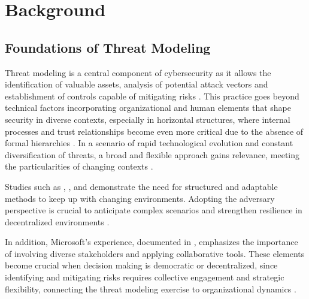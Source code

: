
%

\chapter{Background}
\label{cha:background}

\glsresetall

\section{Foundations of Threat Modeling}
\label{sec:foundations_threat_modeling}

Threat modeling is a central component of cybersecurity as it allows the
identification of valuable assets, analysis of potential attack vectors and
establishment of controls capable of mitigating risks
\cite{ThreatModelingASummaryOfAvailableMethods}. This practice goes beyond
technical factors incorporating organizational and human elements that shape
security in diverse contexts, especially in horizontal structures, where
internal processes and trust relationships become even more critical due to the
absence of formal hierarchies \cite{Colbac}. In a scenario of rapid
technological evolution and constant diversification of threats, a broad and
flexible approach gains relevance, meeting the particularities of changing
contexts \cite{ThreatModelingdesigningForSecurity}.

Studies such as \cite{ThreatModelingAsABasisForSecurityRequirements},
\cite{AdvancedThreatModeling}, and \cite{DemystifyingTheThreatModelingProcess}
demonstrate the need for structured and adaptable methods to keep up with
changing environments. Adopting the adversary perspective is crucial to
anticipate complex scenarios and strengthen resilience in decentralized
environments \cite{AHybridThreatModelingMethod}.

In addition, Microsoft's experience, documented in
\cite{ExperiencesThreatModelingAtMicrosoft}, emphasizes the importance of
involving diverse stakeholders and applying collaborative tools. These elements
become crucial when decision making is democratic or decentralized, since
identifying and mitigating risks requires collective engagement and strategic
flexibility, connecting the threat modeling exercise to organizational dynamics
\cite{ParticipatoryThreatModelling, ThreatModelingASummaryOfAvailableMethods}.


